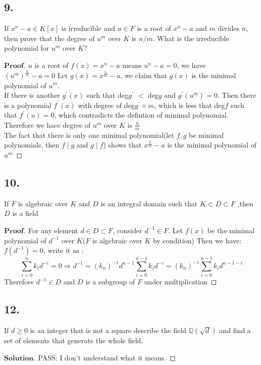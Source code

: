 \documentclass[a4paper, 11pt]{article}
\newenvironment{myprf}
{\renewcommand\qedsymbol{$ $}\begin{proof}[$\mathbf{Proof}$]}
  {\end{proof}}
\newenvironment{solution}
{\renewcommand\qedsymbol{$ $}\begin{proof}[$\mathbf{Solution}$]}
  {\end{proof}}
\begin{document}
\subsection*{9.}
If $x^n-a\in K[x]$ is irreducible and $u\in F$ is a root of $x^n-a$ and $m$ divides $n$,
then prove that the degree of $u^m$ over $K$ is $n/m$. What is the irreducible polynomial
for $u^m$ over $K$?
\begin{myprf}
        $u$ is a root of $f(x)=x^n-a$ means $u^n-a=0$, we have $(u^m)^{\frac{n}{m}}-a=0$
        Let $g(x)=x^{\frac{n}{m}}-a$, we claim that $g(x)$ is the minimal polynomial
        of $u^m$. \\
        \indent If there is another $g^{'}(x)$ such that deg$g^{'}$ $<$ deg$g$ and $g^{'}(u^m)=0$.
        Then there is a polynomial $f^{'}(x)$ with degree of deg$g^{'}\times m$, which
        is less that deg$f$
        such that $f^{'}(u)=0$, which contradicts the defintion of minimal polynomial.
        Therefore we hace degree of $u^m$ over $K$ is $\frac{n}{m}$\\
        \indent The fact that there is only one minimal polynomial(let $f,g$ be minimal
        polynomials, then $f\mid g$ and $g\mid f$) shows that $x^{\frac{n}{m}}-a$ is the 
        minimal polynomial of $u^m$

 \end{myprf}
 
 \subsection*{10.}
 If $F$ is algebraic over $K$ and $D$ is an integral domain such that $K\subset D\subset F$
 ,then $D$ is a field

 \begin{myprf}
         For any element $d\in D\subset F$, consider $d^{-1} \in F$. Let $f(x)$ be the 
         minimal polynomial of $d^{-1}$ over $K$($F$ is algebraic over $K$ by condition)
         Then we have: $f(d^{-1})=0$, write it as :
         $$
         \sum_{i=0}^n k_i d^{-i} = 0\Rightarrow d^{-1}=(k_n)^{-1}d^{n-1}\sum_{i=0}^{n-1}
         k_i d^{-i} = (k_n)^{-1}\sum_{i=0}^{n-1}k_id^{n-1-i}
         $$ Therefore $d^{-1}\in D$ and $D$ is a subgroup of $F$ under multiplication
    
 \end{myprf}

 \subsection*{12.}
 If $d\ge 0$ is an integer that is not a square describe the field $\mathbb{Q}(\sqrt{d})$
 and find a set of elements that generate the whole field.
 \begin{solution}
         
         PASS: I don't understand what it means.
 \end{solution}
 
\end{document}
